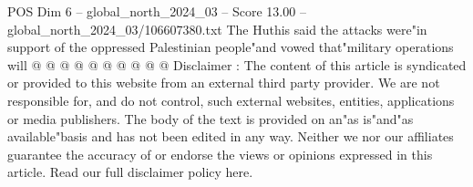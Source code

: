 \begin{textsample}{POS Dim 6 – global\_north\_2024\_03 – Score 13.00 – global\_north\_2024\_03/106607380.txt}
The Huthis said the attacks were"in support of the oppressed Palestinian people"and vowed that"military operations will @ @ @ @ @ @ @ @ @ @ Disclaimer : The content of this article is syndicated or provided to this website from an external third party provider.
We are not responsible for, and do not control, such external websites, entities, applications or media publishers.
The body of the text is provided on an"as is"and"as available"basis and has not been edited in any way.
Neither we nor our affiliates guarantee the accuracy of or endorse the views or opinions expressed in this article.
Read our full disclaimer policy here.

\end{textsample}
